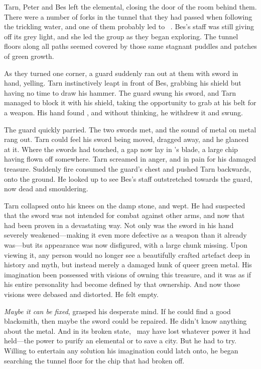 

Tarn, Peter and Bes left the elemental, closing the door of the room behind them.  There were a number of forks in the tunnel that they had passed when following the trickling water, and one of them probably led to \mothzam\ \driktur.  Bes's staff was still giving off its grey light, and she led the group as they began exploring.  The tunnel floors along all paths seemed covered by those same stagnant puddles and patches of green growth.

As they turned one corner, a guard suddenly ran out at them with sword in hand, yelling.  Tarn instinctively leapt in front of Bes, grabbing his shield but having no time to draw his hammer.    The guard swung his sword, and Tarn managed to block it with his shield, taking the opportunity to grab at his belt for a weapon.  His hand found \kildir, and without thinking, he withdrew it and swung.

The guard quickly parried.  The two swords met, and the sound of metal on metal rang out.  Tarn could feel his sword being moved, dragged away, and he glanced at it.  Where the swords had touched, a gap now lay in \kildir's blade, a large chip having flown off somewhere.  Tarn screamed in anger, and in pain for his damaged treasure.  Suddenly fire consumed the guard's chest and pushed Tarn backwards, onto the ground.  He looked up to see Bes's staff outstretched towards the guard, now dead and smouldering.

Tarn collapsed onto his knees on the damp stone, and wept.  He had suspected that the sword was not intended for combat against other arms, and now that had been proven in a devastating way.   Not only was the sword in his hand severely weakened---making it even more defective as a weapon than it already was---but its appearance was now disfigured, with a large chunk missing.  Upon viewing it, any person would no longer see a beautifully crafted artefact deep in history and myth, but instead merely a damaged hunk of queer green metal.  His imagination been possessed with visions of owning this treasure, and it was as if his entire personality had become defined by that ownership.  And now those visions were debased and distorted.  He felt empty.

\emph{Maybe it can be fixed}, grasped his desperate mind.  If he could find a good blacksmith, then maybe the sword could be repaired.  He didn't know anything about the metal.  And in its broken state, \kildir\ may have lost whatever power it had held---the power to purify an elemental or to save a city.  But he had to try.  Willing to entertain any solution his imagination could latch onto, he began searching the tunnel floor for the chip that had broken off.

